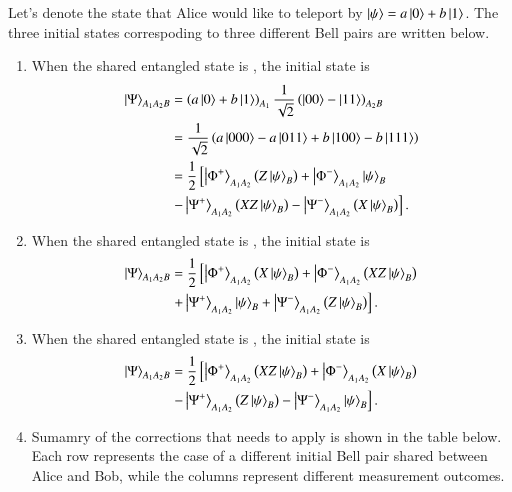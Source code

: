 \begin{solution}
Let's denote the state that Alice would like to teleport by $\left| \psi \right\rangle=a\left| 0 \right\rangle+b\left| 1 \right\rangle$. The three initial states correspoding to three different Bell pairs are written below.
\begin{enumerate}[label=(\alph*)]
    \item When the shared entangled state is \ket{\Phi^-}, the initial state is
    \begin{align*}
        \left| \Psi \right\rangle_{A_1A_2B} & = \left( a\left| 0 \right\rangle+b\left| 1 \right\rangle\right)_{A_1} \frac{1}{\sqrt{2}}\left( \left| 00 \right\rangle - \left| 11 \right\rangle \right)_{A_2B} \\
        & = \frac{1}{\sqrt{2}} \left( a\left| 000 \right\rangle - a\left| 011 \right\rangle + b\left| 100 \right\rangle - b\left| 111 \right\rangle \right) \\
        & = \frac{1}{2}\left[ \left| \Phi^+ \right\rangle_{A_1A_2}\left( Z\left| \psi \right\rangle_B \right) +  \left| \Phi^- \right\rangle_{A_1A_2} \left| \psi \right\rangle_B \right.\\
        & \left. - \left| \Psi^+ \right\rangle_{A_1A_2}\left( XZ \left| \psi \right\rangle_B \right) - \left| \Psi^- \right\rangle_{A_1A_2}\left( X\left| \psi \right\rangle_B \right) \right].
    \end{align*}
    \item When the shared entangled state is \ket{\Psi^+}, the initial state is
    \begin{align*}
        \left| \Psi \right\rangle_{A_1A_2B} & = \frac{1}{2}\left[ \left| \Phi^+ \right\rangle_{A_1A_2}\left( X\left| \psi \right\rangle_B \right) +  \left| \Phi^- \right\rangle_{A_1A_2} \left( XZ \left| \psi \right\rangle_B \right) \right.\\
        & \left. + \left| \Psi^+ \right\rangle_{A_1A_2}\left| \psi \right\rangle_B + \left| \Psi^- \right\rangle_{A_1A_2}\left( Z\left| \psi \right\rangle_B \right) \right].
    \end{align*}
    \item When the shared entangled state is \ket{\Psi^-}, the initial state is
    \begin{align*}
        \left| \Psi \right\rangle_{A_1A_2B} & = \frac{1}{2}\left[ \left| \Phi^+ \right\rangle_{A_1A_2}\left( XZ \left| \psi \right\rangle_B \right) +  \left| \Phi^- \right\rangle_{A_1A_2} \left( X \left| \psi \right\rangle_B \right) \right.\\
        & \left. - \left| \Psi^+ \right\rangle_{A_1A_2} \left(Z \left| \psi \right\rangle_B \right) - \left| \Psi^- \right\rangle_{A_1A_2} \left| \psi \right\rangle_B \right].
    \end{align*}
    \item Sumamry of the corrections that needs to apply is shown in the table below. Each row represents the case of a different initial Bell pair shared between Alice and Bob, while the columns represent different measurement outcomes.
    \begin{table}[h]

\end{table}
\end{enumerate}
\end{solution}
